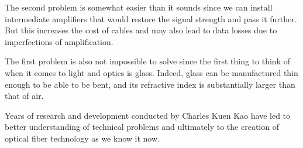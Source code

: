 \documentclass[a4paper, 12pt]{article}
\begin{document}
The second problem is somewhat easier than it sounds since we can 
install intermediate amplifiers that would restore the signal strength 
and pass it further. But this increases the cost of cables and may also 
lead to data losses due to imperfections of amplification.

The first problem is also not impossible to solve since the first thing 
to think of when it comes to light and optics is glass. Indeed, glass 
can be manufactured thin enough to be able to be bent, and its 
refractive index is substantially larger than that of air.

Years of research and development conducted by Charles Kuen Kao have led 
to better understanding of technical problems and ultimately to the 
creation of optical fiber technology as we know it now.
\end{document}
